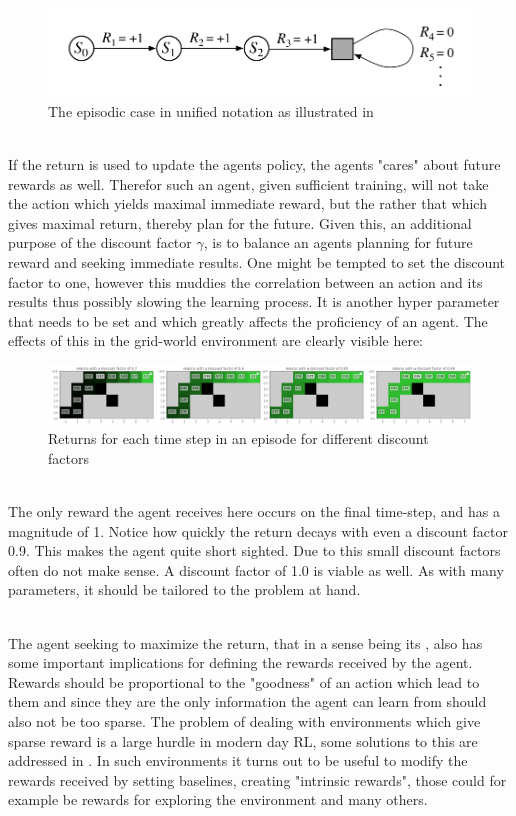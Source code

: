 \begin{figure}[h!]
    \centering
    \includegraphics[width=0.6\linewidth]{figures/unified_notation_from_book.png}
    \caption{The episodic case in unified notation as illustrated in }
    \label{fig:unified_continuous_episodic_return}
\end{figure}

\noindent
\\ If the return is used to update the agents policy, the agents "cares" about future rewards as well. Therefor such an agent, given sufficient training, will not take the action which yields maximal immediate reward, but the rather that which gives maximal return, thereby plan for the future. Given this, an additional purpose of the discount factor $\gamma$, is to balance an agents planning for future reward and seeking immediate results. One might be tempted to set the discount factor to one, however this muddies the correlation between an action and its results thus possibly slowing the learning process. It is another hyper parameter that needs to be set and which greatly affects the proficiency of an agent. The effects of this in the grid-world environment are clearly visible here:

\begin{figure}[h!]
    \centering
    \includegraphics[width=\linewidth]{figures/grid_world_discount_factors.png}
    \caption{Returns for each time step in an episode for different discount factors}
    \label{fig:grid_world_discount_factors}
\end{figure}

\noindent
\\ The only reward the agent receives here occurs on the final time-step, and has a magnitude of 1. Notice how quickly the return decays with even a discount factor 0.9. This makes the agent quite short sighted. Due to this small discount factors often do not make sense. A discount factor of 1.0 is viable as well. As with many parameters, it should be tailored to the problem at hand.

\noindent
\\ The agent seeking to maximize the return, that in a sense being its , also has some important implications for defining the rewards received by the agent. Rewards should be proportional to the "goodness" of an action which lead to them and since they are the only information the agent can learn from should also not be too sparse. The problem of dealing with environments which give sparse reward is a large hurdle in modern day RL, some solutions to this are addressed in . In such environments it turns out to be useful to modify the rewards received by setting baselines, creating "intrinsic rewards", those could for example be rewards for exploring the environment and many others. 

